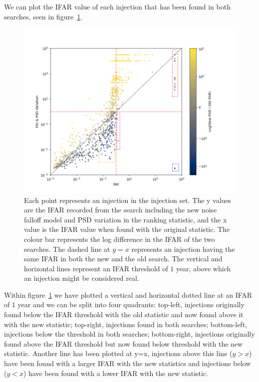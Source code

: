 We can plot the IFAR value of each injection that has been found in both searches, seen in 
figure~\ref{fig:pycbclive-ifar-ifar-psdvar-4s}.
%
\begin{figure}
  \centering
  \begin{minipage}[t]{1.0\linewidth}
  
    \includegraphics[width=1.0\textwidth]{images/5_pycbclive/psdvar_4s_ifar_vs_ifar_regions.png}
    \caption{Each point represents an injection in the injection set. The y values are the IFAR recorded from the search including the new noise falloff model and PSD variation in the ranking statistic, and the x value is the IFAR value when found with the original statistic. The colour bar represents the log difference in the IFAR of the two searches. The dashed line at $y=x$ represents an injection having the same IFAR in both the new and the old search. The vertical and horizontal lines represent an IFAR threshold of $1$ year, above which an injection might be considered real.}
    \label{fig:pycbclive-ifar-ifar-psdvar-4s}

  \end{minipage}
\end{figure}
%
Within figure~\ref{fig:pycbclive-ifar-ifar-psdvar-4s} we have plotted a vertical and horizontal dotted line at an IFAR of $1$ year and we can be split into four quadrants: top-left, injections originally found below the IFAR threshold with the old statistic and now found above it with the new statistic; top-right, injections found in both searches; bottom-left, injections below the threshold in both searches; bottom-right, injections originally found above the IFAR threshold but now found below threshold with the new statistic. Another line has been plotted at y=x, injections above this line ($y > x$) have been found with a larger IFAR with the new statistics and injections below ($y < x$) have been found with a lower IFAR with the new statistic.

